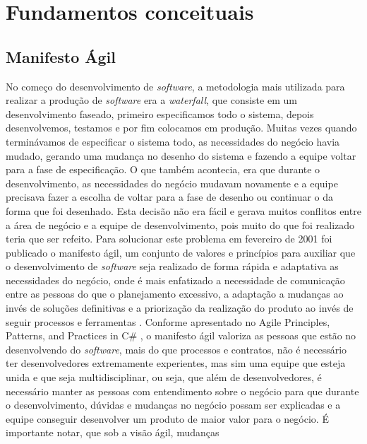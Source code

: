 \part{Fundamentos conceituais}
  \chapter{Manifesto Ágil}
    No começo do desenvolvimento de \textit{software}, a metodologia mais utilizada
    para realizar a produção de \textit{software} era a \textit{waterfall}, que
    consiste em um desenvolvimento faseado, primeiro especificamos todo o sistema,
    depois desenvolvemos, testamos e por fim colocamos em produção. Muitas vezes
    quando terminávamos de especificar o sistema todo, as necessidades do
    negócio havia mudado, gerando uma mudança no desenho do sistema e fazendo a
    equipe voltar para a fase de especificação. O que também acontecia, era que
    durante o desenvolvimento, as necessidades do negócio mudavam novamente e
    a equipe precisava fazer a escolha de voltar para a fase de desenho ou continuar
    o da forma que foi desenhado. Esta decisão não era fácil e gerava muitos conflitos
    entre a área de negócio e a equipe de desenvolvimento, pois muito do que foi
    realizado teria que ser refeito. \newline
    Para solucionar este problema em fevereiro de 2001 foi publicado o manifesto
    ágil, um conjunto de valores e princípios para auxiliar que o desenvolvimento de
    \textit{software} seja realizado de forma rápida e adaptativa as
    necessidades do negócio, onde é mais enfatizado a necessidade de comunicação
    entre as pessoas do que o planejamento excessivo, a adaptação a mudanças ao
    invés de soluções definitivas e a priorização da realização do produto ao
    invés de seguir processos e ferramentas \cite{manifestoAgile}. \newline
    Conforme apresentado no Agile Principles, Patterns, and Practices in C\#
    \cite{martin2007agile}, o manifesto ágil valoriza as pessoas que estão
    no desenvolvendo do \textit{software}, mais do que processos e contratos,
    não é necessário ter desenvolvedores extremamente experientes, mas sim
    uma equipe que esteja unida e que seja multidisciplinar, ou seja, que além de
    desenvolvedores, é necessário manter as pessoas com entendimento sobre o
    negócio para que durante o desenvolvimento, dúvidas e mudanças no negócio
    possam ser explicadas e a equipe conseguir desenvolver um produto de maior
    valor para o negócio. É importante notar, que sob a visão ágil, mudanças
